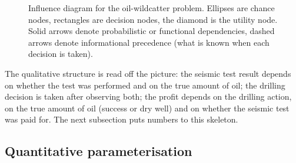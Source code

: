 \begin{figure}[H]
    \centering
    \caption{Influence diagram for the oil-wildcatter problem.
    Ellipses are chance nodes, rectangles are decision nodes, the
    diamond is the utility node. Solid arrows denote probabilistic
    or functional dependencies, dashed arrows denote informational
    precedence (what is known when each decision is taken).}
    \label{fig:oilid}
\end{figure}

The qualitative structure is read off the picture: the seismic test
result depends on whether the test was performed and on the true
amount of oil; the drilling decision is taken after observing both;
the profit depends on the drilling action, on the true amount of oil
(success or dry well) and on whether the seismic test was paid for.
The next subsection puts numbers to this skeleton.

\subsection{Quantitative parameterisation}

